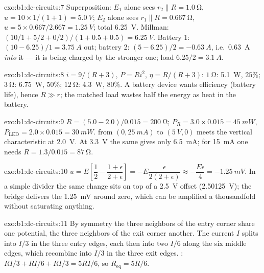 \begin{solution}{exo:b1:dc-circuits:7}
Superposition: $E_1$ alone sees $r_2 \parallel R = \qty{1.0}{\ohm}$,
$u = 10 \times 1/(1 + 1) = \qty{5.0}{V}$; $E_2$ alone sees $r_1 \parallel R
= \qty{0.667}{\ohm}$, $u = 5 \times 0.667/2.667 = \qty{1.25}{V}$; total
\qty{6.25}{V}. Millman: $(10/1 + 5/2 + 0/2)/(1 + 0.5 + 0.5) = \qty{6.25}{V}$.
Battery 1: $(10 - 6.25)/1 = \qty{3.75}{A}$ out; battery 2: $(5 - 6.25)/2
= \qty{-0.63}{A}$, i.e.\ \qty{0.63}{A} \emph{into} it --- it is being
charged by the stronger one; load $6.25/2 = \qty{3.1}{A}$.
\end{solution}

\begin{solution}{exo:b1:dc-circuits:8}
$i = 9/(R + 3)$, $P = Ri^2$, $\eta = R/(R + 3)$: $\qty{1}{\ohm}$:
\qty{5.1}{W}, $25\%$; $\qty{3}{\ohm}$: \qty{6.75}{W}, $50\%$;
$\qty{12}{\ohm}$: \qty{4.3}{W}, $80\%$. A battery device wants
efficiency (battery life), hence $R \gg r$; the matched load wastes half
the energy as heat in the battery.
\end{solution}

\begin{solution}{exo:b1:dc-circuits:9}
$R = (5.0 - 2.0)/0.015 = \qty{200}{\ohm}$; $P_R = 3.0 \times 0.015 =
\qty{45}{mW}$, $P_{\mathrm{LED}} = 2.0 \times 0.015 = \qty{30}{mW}$.  from $(0, \qty{25}{mA})$ to $(\qty{5}{V}, 0)$ meets the vertical
characteristic at \qty{2.0}{V}. At \qty{3.3}{V} the same  gives
only \qty{6.5}{mA}; for \qty{15}{mA} one needs $R = 1.3/0.015 =
\qty{87}{\ohm}$.
\end{solution}

\begin{solution}{exo:b1:dc-circuits:10}
$u = E\left[\dfrac12 - \dfrac{1 + \epsilon}{2 + \epsilon}\right] =
-E\dfrac{\epsilon}{2(2 + \epsilon)} \approx -\dfrac{E\epsilon}{4} =
\qty{-1.25}{mV}$. In a simple divider the same change sits on top of a
\qty{2.5}{V} offset (\qty{2.50125}{V}); the bridge delivers the
\qty{1.25}{mV} around zero, which can be amplified a thousandfold
without saturating anything.
\end{solution}

\begin{solution}{exo:b1:dc-circuits:11}
By symmetry the three neighbors of the entry corner share one
potential, the three neighbors of the exit corner another. The current
$I$ splits into $I/3$ in the three entry edges, each then into two
$I/6$ along the six middle edges, which recombine into $I/3$ in the
three exit edges. : $RI/3 + RI/6 + RI/3 = 5RI/6$, so
$R_{\mathrm{eq}} = 5R/6$.
\end{solution}


